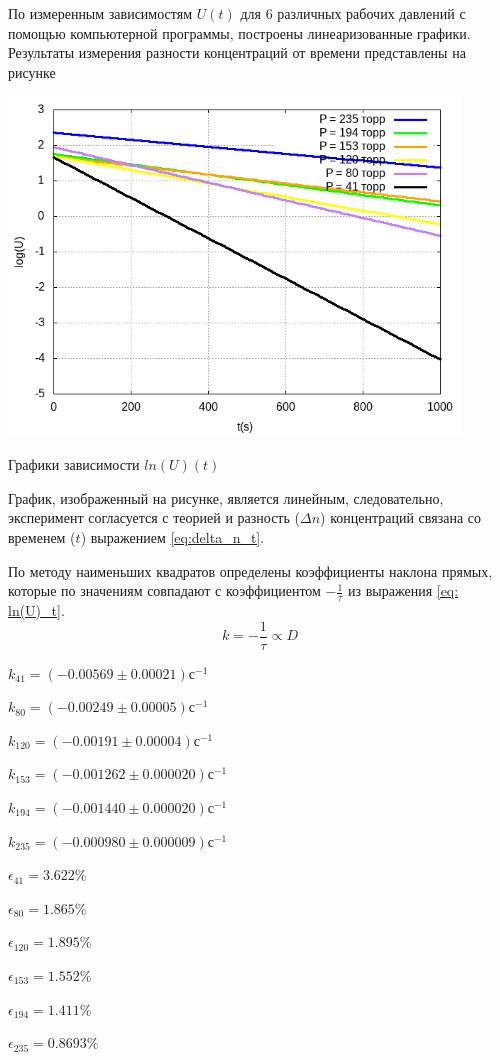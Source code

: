 По измеренным зависимостям $U(t)$ для 6 различных рабочих давлений с помощью компьютерной программы, построены линеаризованные графики.
Результаты измерения разности концентраций от времени представлены на рисунке
\begin{center}
    \includegraphics[width=0.9\textwidth]{img/graph1.png}
    
    Графики зависимости $ln(U)(t)$
\end{center}

График, изображенный на рисунке, является линейным, следовательно, эксперимент согласуется с теорией и разность ($\Delta n$) концентраций связана со временем ($t$) выражением \eqref{eq:delta_n_t}.

По методу наименьших квадратов определены коэффициенты наклона прямых, которые по значениям совпадают с коэффициентом $-\frac{1}{\tau}$ из выражения \eqref{eq: ln(U)_t}.
\begin{equation}
    k = -\frac{1}{\tau} \propto D \label{eq: k}
\end{equation}
\begin{center}
    $k_{41} = (-0.00569 \pm 0.00021)\text{с}^{-1}$
    
    $k_{80} = (-0.00249 \pm 0.00005)\text{с}^{-1}$
    
    $k_{120} = (-0.00191 \pm 0.00004)\text{с}^{-1}$
    
    $k_{153} = (-0.001262 \pm 0.000020)\text{с}^{-1}$
    
    $k_{194} = (-0.001440 \pm 0.000020)\text{с}^{-1}$
    
    $k_{235} = (-0.000980 \pm 0.000009)\text{с}^{-1}$

    $\epsilon_{41} = 3.622\%$

    $\epsilon_{80} = 1.865\%$

    $\epsilon_{120} = 1.895\%$

    $\epsilon_{153} = 1.552\%$

    $\epsilon_{194} = 1.411\%$

    $\epsilon_{235} = 0.8693\%$
\end{center}



